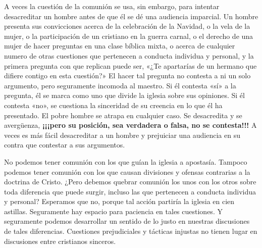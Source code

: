 \documentclass[12pt, twoside, openright]{book}
\begin{document}
A veces la cuestión de la comunión se usa, sin embargo, para intentar desacreditar un hombre antes de que él se dé una audiencia imparcial. Un hombre presenta sus convicciones acerca de la celebración de la Navidad, o la vela de la mujer, o la participación de un cristiano en la guerra carnal, o el derecho de una mujer de hacer preguntas en una clase bíblica mixta, o acerca de cualquier numero de otras cuestiones que pertenecen a conducta individua y personal, y la primera pregunta con que replican puede ser, «¿Te apartarías de un hermano que difiere contigo en esta cuestión?» El hacer tal pregunta no contesta a ni un solo argumento, pero seguramente incomoda al maestro. Si él contesta «sí» a la pregunta, él se marca como uno que divide la iglesia sobre sus opiniones. Si él contesta «no», se cuestiona la sinceridad de su creencia en lo que él ha presentado. El pobre hombre se atrapa en cualquier caso. Se desacredita y se avergüenza, \textbf{¡¡¡pero su posición, sea verdadera o falsa, no se contesta!!!} A veces es más fácil desacreditar a un hombre y prejuiciar una audiencia en su contra que contestar a sus argumentos.

No podemos tener comunión con los que guían la iglesia a apostasía. Tampoco podemos tener comunión con los que causan divisiones y ofensas contrarias a la doctrina de Cristo. ¿Pero debemos quebrar comunión los unos con los otros sobre toda diferencia que puede surgir, incluso las que pertenecen a conducta individua y personal? Esperamos que no, porque tal acción partiría la iglesia en cien astillas. Seguramente hay espacio para paciencia en tales cuestiones. Y seguramente podemos desarrollar un sentido de lo justo en nuestras discusiones de tales diferencias. Cuestiones prejudiciales y tácticas injustas no tienen lugar en discusiones entre cristianos sinceros.
\end{document}
